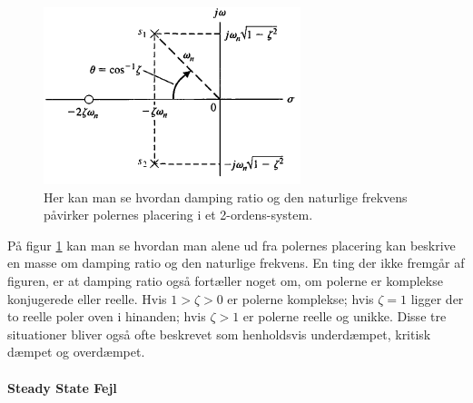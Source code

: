 \begin{figure}
\vspace{-20pt}
	\begin{center}
		\includegraphics[scale=0.8]{Billeder/SO_system.PNG}
	\end{center}
	\vspace{-10pt}
	\caption{Her kan man se hvordan damping ratio og den naturlige frekvens påvirker polernes placering i et 2-ordens-system.}
	\label{fig:SO_system}
\vspace{0pt}
\end{figure}

På figur \ref{fig:SO_system} kan man se hvordan man alene ud fra polernes placering kan beskrive en masse om damping ratio og den naturlige frekvens. En ting der ikke fremgår af figuren, er at damping ratio også fortæller noget om, om polerne er komplekse konjugerede eller reelle. Hvis $1>\zeta>0$ er polerne komplekse; hvis $\zeta=1$ ligger der to reelle poler oven i hinanden; hvis $\zeta>1$ er polerne reelle og unikke. Disse tre situationer bliver også ofte beskrevet som henholdsvis underdæmpet, kritisk dæmpet og overdæmpet.


\paragraph{Steady State Fejl}

